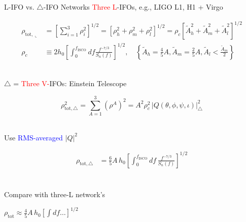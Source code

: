 \documentclass[xcolor=dvipsnames,handout,t]{beamer}
\newcommand{\red}[1]{\textcolor{red}{#1}}
\newcommand{\bl}[1]{\textcolor{blue}{#1}}
\newcommand{\f}{\frac}
\begin{document}
\begin{frame}{L-IFO vs. $\bigtriangleup$-IFO Networks}
\red{Three L}-IFOs, e.g., LIGO L1, H1 + Virgo
%
\begin{footnotesize} 
\begin{align*}
\rho_{\text{tot},\llcorner} &= \left[{\sum_{i=1}^3 \rho^2_i}\right]^{1/2} =\left[ \rho_h^2 + \rho_m^2 + \rho^2_l \right]^{1/2} 
	= {\rho_c\left[\tilde{A}_h^2 + \tilde{A}_m^2 + \tilde{A}_l^2 \right]^{1/2}}\\
\rho_c &\equiv 2 h_0 \left[ \int_0^{{f_\text{ISCO}}} df \f{f^{-7/3}}{S_n(f)}  \right]^{1/2}, \quad \left\{ \tilde{A}_h = \tfrac{4}{5}A,  \tilde{A}_m =\tfrac{2}{5}A,  \tilde{A}_l  < \tfrac{\tilde{A}_m}{2}\right\}
\end{align*}
\end{footnotesize}
%
\\
$\bigtriangleup$ = \red{Three V-}IFOs: Einstein Telescope
\begin{footnotesize} 
\[
 \rho^2_{\text{tot},\bigtriangleup} = \sum_{A=1}^3 \left(\rho^A\right)^2  =  A^2 \rho_c^2 \,|Q(\theta,\phi,\psi,\iota)|_\bigtriangleup^2 %
\]
\end{footnotesize}
\\
Use \bl{RMS-averaged} $|Q|^2$
\begin{footnotesize}
\begin{align*}
\rho_{\text{tot},\bigtriangleup} %
&=\f{6}{5}A\, h_0 \left[\int_0^{f_\text{ISCO}} d f\, \f{f^{-7/3}}{S_n(f)}\right]^{1/2} \\
\end{align*}
\end{footnotesize}
\\
\vspace{-5mm}
Compare with three-L network's \begin{small}$\rho_\text{tot} \approx \tfrac{4}{5}A\, h_0 \left[ \int df \ldots \right]^{1/2} $ \end{small}
\vspace{10mm}
%
%
%
% 
\end{frame}
\end{document}
